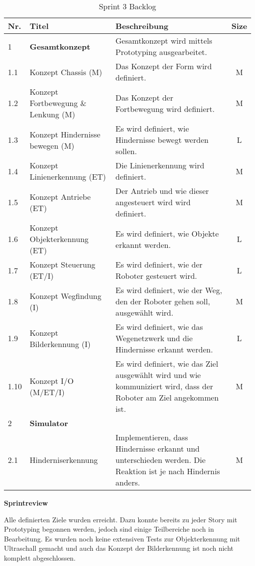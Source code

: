 \begin{table}[H]
\centering
\small
\begin{tabularx}{\textwidth}{|l|l|X|c|}
\hline
  \textbf{Nr.} & \textbf{Titel} & \textbf{Beschreibung} & \textbf{Size}\\
  \hline
  1  & \textbf{Gesamtkonzept} & Gesamtkonzept wird mittels Prototyping ausgearbeitet.&\\
  \hline
  1.1  & Konzept Chassis (M) &  Das Konzept der Form wird definiert. & M\\
  \hline
  1.2  & Konzept Fortbewegung \& Lenkung (M) &  Das Konzept der Fortbewegung wird definiert. & M\\
  \hline
  1.3 & Konzept Hindernisse bewegen (M) & Es wird definiert, wie Hindernisse bewegt werden sollen. & L\\
  \hline
  1.4 & Konzept Linienerkennung (ET) & Die Linienerkennung wird definiert. & M\\
  \hline
  1.5 & Konzept Antriebe (ET) & Der Antrieb und wie dieser angesteuert wird wird definiert. & M\\
  \hline
  1.6 & Konzept Objekterkennung (ET) & Es wird definiert, wie Objekte erkannt werden. & L\\
  \hline
  1.7 & Konzept Steuerung (ET/I) & Es wird definiert, wie der Roboter gesteuert wird. & L\\
  \hline
    1.8 & Konzept Wegfindung (I) & Es wird definiert, wie der Weg, den der Roboter gehen soll, ausgewählt wird.  & M\\
\hline
    1.9 & Konzept Bilderkennung (I) & Es wird definiert, wie das Wegenetzwerk und die Hindernisse erkannt werden. & L\\
\hline
    1.10 & Konzept I/O (M/ET/I) & Es wird definiert, wie das Ziel ausgewählt wird und wie kommuniziert wird, dass der Roboter am Ziel angekommen ist. & M\\
\hline

  2  & \textbf{Simulator} &&\\
  \hline
    2.1 & Hinderniserkennung & Implementieren, dass Hindernisse erkannt und unterschieden werden. Die Reaktion ist je nach Hindernis anders.& M \\
    \hline
  
\end{tabularx}
\caption{Sprint 3 Backlog}
\label{table:sprint3-backlog}
\end{table}

\textbf{Sprintreview}

Alle definierten Ziele wurden erreicht. Dazu konnte bereits zu jeder Story mit Prototyping begonnen werden, jedoch sind einige Teilbereiche noch in Bearbeitung. Es wurden noch keine extensiven Tests zur Objekterkennung mit Ultraschall gemacht und auch das Konzept der Bilderkennung ist noch nicht komplett abgeschlossen.

